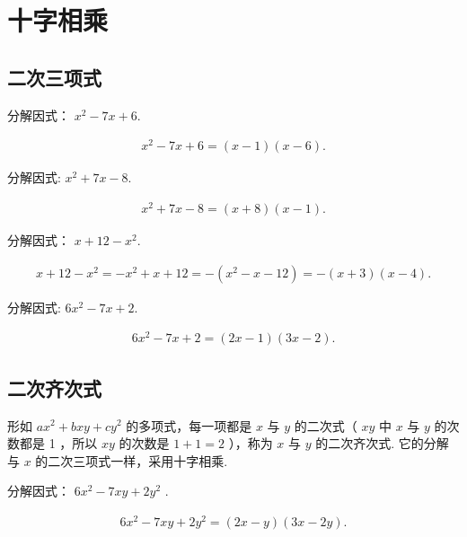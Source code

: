 \section{十字相乘}
\subsection{二次三项式}
\begin{example}
	分解因式： $x^{2}-7 x+6.$
\end{example}
\begin{solution}
	\begin{align*}
		x^{2}-7 x+6=(x-1)(x-6) .
	\end{align*}
\end{solution}

\begin{example}
	分解因式: $x^{2}+7 x-8$.
\end{example}
\begin{solution}
	\begin{align*}
		x^{2}+7 x-8=(x+8)(x-1).
	\end{align*}
\end{solution}

\begin{example}
	分解因式： $x+12-x^{2}$.
\end{example}
\begin{solution}
	\begin{align*}
		x+12-x^{2}=-x^{2}+x+12=-\left(x^{2}-x-12\right)=-(x+3)(x-4).
	\end{align*}
\end{solution}

\begin{example}[二次项系数不为 1]
	分解因式: $6 x^{2}-7 x+2$.
\end{example}
\begin{solution}
	\begin{align*}
		6 x^{2}-7 x+2=(2 x-1)(3 x-2).
	\end{align*}
\end{solution}

\subsection{二次齐次式}
形如 $a x^{2}+b x y+c y^{2}$ 的多项式，每一项都是 $x$ 与 $y$ 的二次式（ $x y$ 中 $x$ 与 $y$ 的次数都是 1 ，所以 $x y$ 的次数是 $1+1=2$ ），称为 $x$ 与 $y$ 的二次齐次式. 它的分解与 $x$ 的二次三项式一样，采用十字相乘.

\begin{example}
	分解因式： $6 x^{2}-7 x y+2 y^{2}$ .
\end{example}
\begin{solution}
	\begin{align*}
		6 x^{2}-7 x y+2 y^{2}=(2 x-y)(3 x-2 y).
	\end{align*}
\end{solution}

